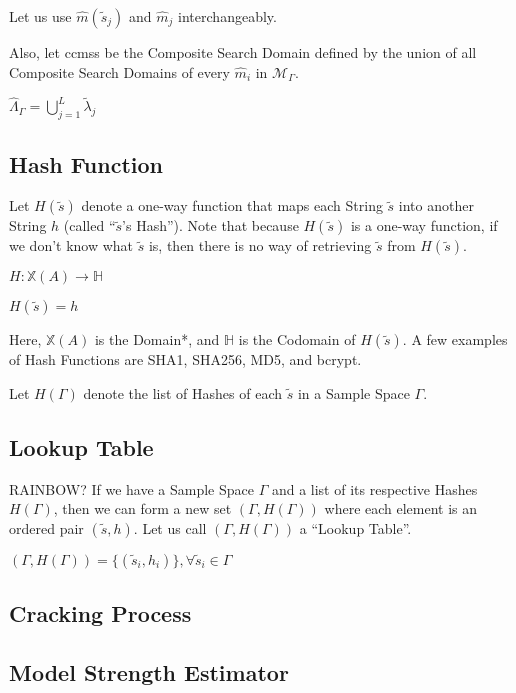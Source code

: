 \documentclass{article}
\begin{document}
Let us use $\hat m(\tilde s_j)$ and $\hat m_j$ interchangeably.

Also, let \gls{ccmss} be the Composite Search Domain defined by the union of all Composite Search Domains of every $\hat m_i$ in $\mathcal{M}_{\Gamma}$.

\begin{center}
 $\hat\Lambda_{\Gamma} = \bigcup\limits_{j=1}^{L} \tilde\lambda_j$
\end{center}

\subsection{Hash Function}

Let $H(\tilde s)$ denote a one-way function that maps each String $\tilde s$ into another String $h$ (called ``$\tilde s$'s Hash'').
Note that because $H(\tilde s)$ is a one-way function, if we don't know what $\tilde s$ is, then there is no way of retrieving $\tilde s$ from $H(\tilde s)$.

\begin{center}
 $H: \mathbb{X}(A) \to \mathbb{H}$
 
 $H(\tilde s) = h$
\end{center}

Here, $\mathbb{X}(A)$ is the Domain*, and $\mathbb{H}$ is the Codomain of $H(\tilde s)$. A few examples of Hash Functions are
SHA1, SHA256, MD5, and bcrypt.

Let $H(\Gamma)$ denote the list of Hashes of each $\tilde s$ in a Sample Space $\Gamma$.

\subsection{Lookup Table}
RAINBOW?
If we have a Sample Space $\Gamma$ and a list of its respective Hashes $H(\Gamma)$, then we can form a new set
$(\Gamma, H(\Gamma))$ where each element is an ordered pair $(\tilde s, h)$. Let us call $(\Gamma, H(\Gamma))$ a ``Lookup Table''.

\begin{center}
 $(\Gamma, H(\Gamma)) = \{(\tilde s_i, h_i)\}, \forall \tilde s_i \in \Gamma$
\end{center}


\subsection{Cracking Process}

\subsection{Model Strength Estimator}
\end{document}
